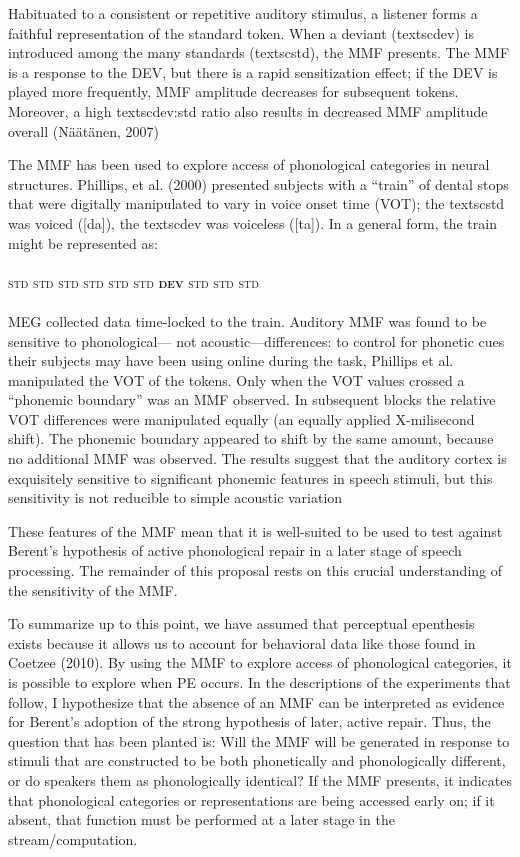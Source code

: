 \documentclass[jou,apacite]{apa6}
\begin{document}
    Habituated to a consistent or repetitive auditory stimulus, a listener forms a faithful representation of the standard token. When a deviant (textsc{dev}) is introduced among the many standards (textsc{std}), the MMF presents. The MMF is a response to the DEV, but there is a rapid sensitization effect; if the DEV is played more frequently, MMF amplitude decreases for subsequent tokens. Moreover, a high textsc{dev:std} ratio also results in decreased MMF amplitude overall (Näätänen, 2007)

    The MMF has been used to explore access of phonological categories in neural structures. Phillips, et al. (2000) presented subjects with a “train” of dental stops that were digitally manipulated to vary in voice onset time (VOT); the textsc{std} was voiced ([da]), the textsc{dev} was voiceless ([ta]). In a general form, the train might be represented as:
    \\
    \\
    \textsc{std std std std std std \textbf{dev} std std std}
    \\
    \\
    MEG collected data time-locked to the train. Auditory MMF was found to be sensitive to phonological— not acoustic—differences: to control for phonetic cues their subjects may have been using online during the task, Phillips et al. manipulated the VOT of the tokens. Only when the VOT values crossed a “phonemic boundary” was an MMF observed. In subsequent blocks the relative VOT differences were manipulated equally (an equally applied X-milisecond shift). The phonemic boundary appeared to shift by the same amount, because no additional MMF was observed. The results suggest that the auditory cortex is exquisitely sensitive to significant phonemic features in speech stimuli, but this sensitivity is not reducible to simple acoustic variation

    These features of the MMF mean that it is well-suited to be used to test against Berent’s hypothesis of active phonological repair in a later stage of speech processing. The remainder of this proposal rests on this crucial understanding of the sensitivity of the MMF.

    To summarize up to this point, we have assumed that perceptual epenthesis exists because it allows us to account for behavioral data like those found in Coetzee (2010). By using the MMF to explore access of phonological categories, it is possible to explore when PE occurs. In the descriptions of the experiments that follow, I hypothesize that the absence of an MMF can be interpreted as evidence for Berent’s adoption of the strong hypothesis of later, active repair. Thus, the question that has been planted is: Will the MMF will be generated in response to stimuli that are constructed to be both phonetically and phonologically different, or do speakers them as phonologically identical? If the MMF presents, it indicates that phonological categories or representations are being accessed early on; if it absent, that function must be performed at a later stage in the stream/computation.
\end{document}
